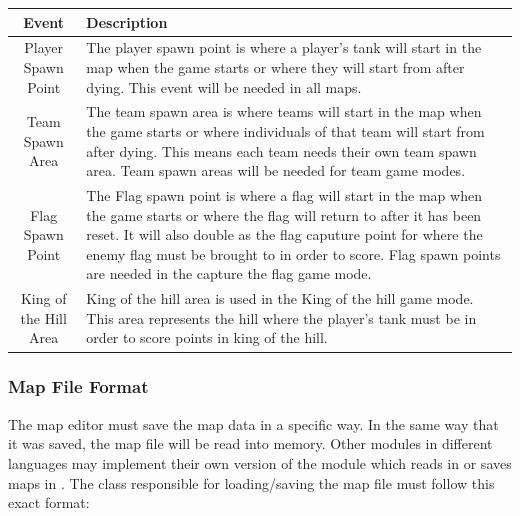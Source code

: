\begin{center}
\centering
\begin{tabular}{ | c | p{8cm} |}
\hline
Event 	& Description \\	[1.0ex]
\hline\hline
Player Spawn Point 	& The player spawn point is where a player's tank will start in the map when the game starts or where they will start from after dying. This event will be needed in all maps. \\	[1.0ex]
Team Spawn Area 	&	The team spawn area is where teams will start in the map when the game starts or where individuals of that team will start from after dying. This means each team needs their own team spawn area. Team spawn areas will be needed for team game modes. \\	[1.0ex]
Flag Spawn Point 	& The Flag spawn point is where a flag will start in the map when the game starts or where the flag will return to after it has been reset. It will also double as the flag caputure point for where the enemy flag must be brought to in order to score. Flag spawn points are needed in the capture the flag game mode. \\	[1.0ex]
King of the Hill Area		& King of the hill area is used in the King of the hill game mode. This area represents the hill where the player's tank must be in order to score points in king of the hill. \\  [1.0ex]
\hline\hline
\end{tabular}
\label{table:nonlin}
\end{center}


\subsubsection{Map File Format}

The map editor must save the map data in a specific way. In the same way that it was saved, the map file will be read into memory. Other modules in different languages may implement their own version of the module which reads in or saves maps in \MapEditor. The class responsible for loading/saving the map file must follow this exact format:

